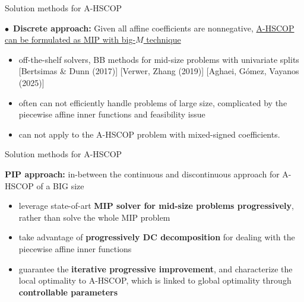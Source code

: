 \documentclass[aspectratio=169,xcolor=dvipsnames]{beamer}
\begin{document}
\begin{frame}{Solution methods for A-HSCOP}
  \small
  \setlength{\parskip}{0.10cm}

  $\bullet$~\textbf{Discrete approach:} Given all affine coefficients are
  nonnegative, \underline{A-HSCOP can be formulated as MIP with big-$M$
  technique}
  \begin{itemize}
    \setlength{\itemsep}{0.10cm}
    \item[--] off-the-shelf solvers, BB methods for mid-size problems with
      univariate splits [Bertsimas \& Dunn (2017)] [Verwer, Zhang (2019)]
      [Aghaei, Gómez, Vayanos (2025)]
    \item[--] often can not efficiently handle problems of large size,
      complicated by the piecewise affine inner functions and feasibility issue
    \item[--] can not apply to the A-HSCOP problem with mixed-signed
      coefficients.
  \end{itemize}
\end{frame}

\begin{frame}{Solution methods for A-HSCOP}
  \small
  \setlength{\parskip}{0.10cm}

  \textcolor{MediumRed}{\textbf{PIP approach:}} in-between the continuous and
  discontinuous approach for A-HSCOP of a BIG size
  \begin{itemize}
    \setlength{\itemsep}{0.12cm}
    \item[--] leverage state-of-art \textbf{MIP solver for mid-size problems
      progressively}, rather than solve the whole MIP problem
    \item[--] take advantage of \textbf{progressively DC decomposition} for
      dealing with the piecewise affine inner functions
    \item[--] guarantee the \textbf{iterative progressive improvement}, and
      characterize the local optimality to A-HSCOP, which is linked to global
      optimality through \textbf{controllable parameters}
  \end{itemize}
\end{frame}
\end{document}

